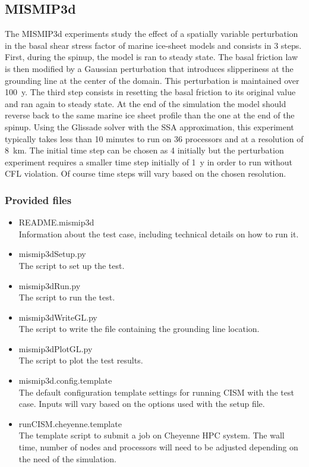 \subsection{MISMIP3d}
\label{sc:mismip3d}
The MISMIP3d experiments \citep{Pattyn2013} study the effect of a spatially variable perturbation in the basal shear stress factor  of marine ice-sheet models and consists in 3 steps. First, during the spinup, the model is ran to steady state. The basal friction law is then modified by a Gaussian perturbation that introduces slipperiness at the grounding line at the center of the domain. This perturbation is maintained over 100~y. The third step consists in resetting the basal friction to its original value and ran again to steady state. At the end of the simulation the model should reverse back to the same marine ice sheet profile than the one at the end of the spinup. 
Using the Glissade solver with the SSA approximation, this experiment typically takes less than 10 minutes to run on 36 processors and at a resolution of 8~km. The initial time step can be chosen as 4 initially but the perturbation experiment requires a smaller time step initially of 1~y in order to run without CFL violation. Of course time steps will vary based on the chosen resolution.


\subsubsection{Provided files}

\begin{itemize}
	\item README.mismip3d \\
		Information about the test case, including technical details on how to run it.
	\item mismip3dSetup.py \\
		The script to set up the test.
	\item mismip3dRun.py \\
		The script to run the test.
	\item mismip3dWriteGL.py \\
		The script to write the file containing the grounding line location.
	\item mismip3dPlotGL.py \\
		The script to plot the test results.		
	\item mismip3d.config.template \\
		The default configuration template settings for running CISM with the test case. Inputs will vary based on the options used with the setup file. 
	\item runCISM.cheyenne.template \\
		The template script to submit a job on Cheyenne HPC system. The wall time, number of nodes and processors will need to be adjusted depending on the need of the simulation. 
\end{itemize}


